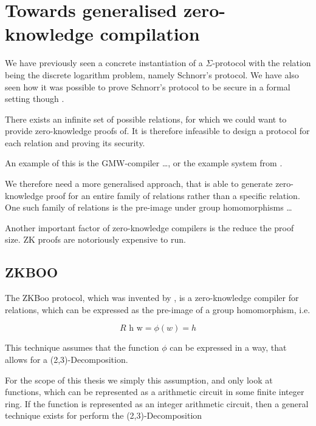 \chapter{Towards generalised zero-knowledge compilation}
\label{ch:general_zk}
We have previously seen a concrete instantiation of a $\Sigma$-protocol with the
relation being the discrete logarithm problem, namely Schnorr's protocol. We
have also seen how it was possible to prove Schnorr's protocol to be secure in a
formal setting though \easycrypt.

There exists an infinite set of possible relations, for which we could want to
provide zero-knowledge proofs of. It is therefore infeasible to design a
protocol for each relation and proving its security.

An example of this is the GMW-compiler \dots, or the example system from \cite{zkcrypt}.

We therefore need a more generalised approach, that is able to generate
zero-knowledge proof for an entire family of relations rather than a specific relation.
One such family of relations is the pre-image under group homomorphisms \dots

Another important factor of zero-knowledge compilers is the reduce the proof
size. ZK proofs are notoriously expensive to run.

\section{ZKBOO}
\label{sec:zkboo}
The ZKBoo protocol, which was invented by \citet{zkboo}, is a zero-knowledge compiler for relations, which can be
expressed as the pre-image of a group homomorphism, i.e.

\[
  R \text{ h w} = \phi(w) = h
\]

This technique assumes that the function $\phi$ can be expressed in a way, that
allows for a (2,3)-Decomposition.


For the scope of this thesis we simply this assumption, and only look at
functions, which can be represented as a arithmetic circuit in some finite
integer ring. If the function is represented as an integer arithmetic circuit,
then a general technique exists for perform the (2,3)-Decomposition




